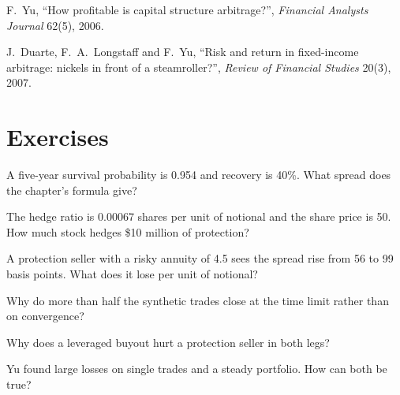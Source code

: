 \begin{omsources}
\item F.~Yu, ``How profitable is capital structure arbitrage?'', \emph{Financial Analysts Journal} 62(5), 2006.
\item J.~Duarte, F.~A.~Longstaff and F.~Yu, ``Risk and return in fixed-income arbitrage: nickels in front of a steamroller?'', \emph{Review of
Financial Studies} 20(3), 2007.
\end{omsources}

\section{Exercises}

\begin{exercise}[$\star$]\label{exo:s2:capital-structure-arbitrage:1}
A five-year survival probability is 0.954 and recovery is 40\%. What spread does the chapter's formula give?
\end{exercise}

\begin{exercise}[$\star$]\label{exo:s2:capital-structure-arbitrage:2}
The hedge ratio is 0.00067 shares per unit of notional and the share price is 50. How much stock hedges \$10 million of protection?
\end{exercise}

\begin{exercise}[$\star$]\label{exo:s2:capital-structure-arbitrage:3}
A protection seller with a risky annuity of 4.5 sees the spread rise from 56 to 99 basis points. What does it lose per unit of notional?
\end{exercise}

\begin{exercise}[$\star\star$]\label{exo:s2:capital-structure-arbitrage:4}
Why do more than half the synthetic trades close at the time limit rather than on convergence?
\end{exercise}

\begin{exercise}[$\star\star$]\label{exo:s2:capital-structure-arbitrage:5}
Why does a leveraged buyout hurt a protection seller in both legs?
\end{exercise}

\begin{exercise}[$\star\star$]\label{exo:s2:capital-structure-arbitrage:6}
Yu found large losses on single trades and a steady portfolio. How can both be true?
\end{exercise}

